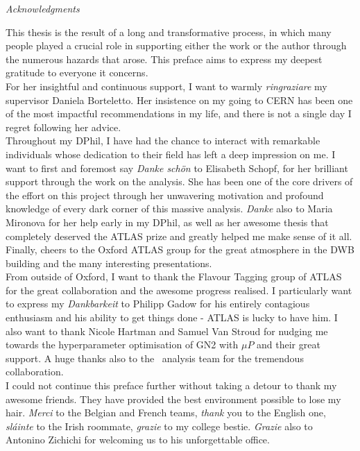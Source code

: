 \clearpage
{
\vspace{-1cm}
\begin{center}
\textit{\large \color{oxfordblue} Acknowledgments}
\end{center}}
This thesis is the result of a long and transformative process, in which many people played a crucial role in supporting either the work or the author through the numerous hazards that arose. This preface aims to express my deepest gratitude to everyone it concerns. \\

For her insightful and continuous support, I want to warmly \textit{ringraziare} my supervisor Daniela Borteletto. Her insistence on my going to CERN has been one of the most impactful recommendations in my life, and there is not a single day I regret following her advice.\\

Throughout my DPhil, I have had the chance to interact with remarkable individuals whose dedication to their field has left a deep impression on me. I want to first and foremost say \textit{Danke schön} to Elisabeth Schopf, for her brilliant support through the work on the analysis. She has been one of the core drivers of the effort on this project through her unwavering motivation and profound knowledge of every dark corner of this massive analysis. \textit{Danke} also to Maria Mironova for her help early in my DPhil, as well as her awesome thesis that completely deserved the ATLAS prize and greatly helped me make sense of it all. Finally, cheers to the Oxford ATLAS group for the great atmosphere in the DWB building and the many interesting presentations. \\

From outside of Oxford, I want to thank the Flavour Tagging group of ATLAS for the great collaboration and the awesome progress realised. I particularly want to express my \textit{Dankbarkeit} to Philipp Gadow for his entirely contagious enthusiasm and his ability to get things done - ATLAS is lucky to have him. I also want to thank Nicole Hartman and Samuel Van Stroud for nudging me towards the hyperparameter optimisation of GN2 with $\mu$$P$ and their great support. A huge thanks also to the \vhbc\ analysis team for the tremendous collaboration. \\

I could not continue this preface further without taking a detour to thank my awesome friends. They have provided the best environment possible to lose my hair. \textit{Merci} to the Belgian and French teams, \textit{thank} you to the English one, \textit{sláinte} to the Irish roommate, \textit{grazie} to my college bestie. \textit{Grazie} also to Antonino Zichichi for welcoming us to his unforgettable office. \\

